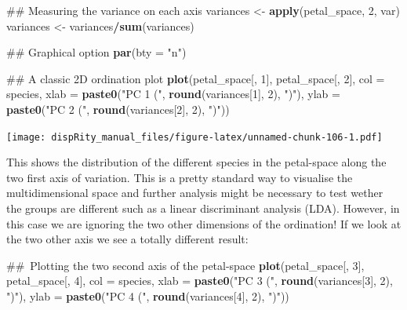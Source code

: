 \documentclass[]{book}
\newenvironment{Shaded}{\begin{snugshade}}{\end{snugshade}}
\newcommand{\KeywordTok}[1]{\textcolor[rgb]{0.13,0.29,0.53}{\textbf{#1}}}
\newcommand{\DataTypeTok}[1]{\textcolor[rgb]{0.13,0.29,0.53}{#1}}
\newcommand{\DecValTok}[1]{\textcolor[rgb]{0.00,0.00,0.81}{#1}}
\newcommand{\StringTok}[1]{\textcolor[rgb]{0.31,0.60,0.02}{#1}}
\newcommand{\OperatorTok}[1]{\textcolor[rgb]{0.81,0.36,0.00}{\textbf{#1}}}
\newcommand{\NormalTok}[1]{#1}
\theoremstyle{definition}
\theoremstyle{definition}
\theoremstyle{remark}
\begin{document}
\begin{Shaded}
\begin{Highlighting}[]
\NormalTok{## Measuring the variance on each axis}
\NormalTok{variances <-}\StringTok{ }\KeywordTok{apply}\NormalTok{(petal_space, }\DecValTok{2}\NormalTok{, var)}
\NormalTok{variances <-}\StringTok{ }\NormalTok{variances}\OperatorTok{/}\KeywordTok{sum}\NormalTok{(variances)}

\NormalTok{## Graphical option}
\KeywordTok{par}\NormalTok{(}\DataTypeTok{bty =} \StringTok{"n"}\NormalTok{)}

\NormalTok{## A classic 2D ordination plot}
\KeywordTok{plot}\NormalTok{(petal_space[, }\DecValTok{1}\NormalTok{], petal_space[, }\DecValTok{2}\NormalTok{], }\DataTypeTok{col =}\NormalTok{ species,}
    \DataTypeTok{xlab =} \KeywordTok{paste0}\NormalTok{(}\StringTok{"PC 1 ("}\NormalTok{, }\KeywordTok{round}\NormalTok{(variances[}\DecValTok{1}\NormalTok{], }\DecValTok{2}\NormalTok{), }\StringTok{")"}\NormalTok{),}
    \DataTypeTok{ylab =} \KeywordTok{paste0}\NormalTok{(}\StringTok{"PC 2 ("}\NormalTok{, }\KeywordTok{round}\NormalTok{(variances[}\DecValTok{2}\NormalTok{], }\DecValTok{2}\NormalTok{), }\StringTok{")"}\NormalTok{))}
\end{Highlighting}
\end{Shaded}

\texttt{[image: dispRity\_manual\_files/figure-latex/unnamed-chunk-106-1.pdf]}

This shows the distribution of the different species in the petal-space
along the two first axis of variation. This is a pretty standard way to
visualise the multidimensional space and further analysis might be
necessary to test wether the groups are different such as a linear
discriminant analysis (LDA). However, in this case we are ignoring the
two other dimensions of the ordination! If we look at the two other axis
we see a totally different result:

\begin{Shaded}
\begin{Highlighting}[]
\NormalTok{## Plotting the two second axis of the petal-space}
\KeywordTok{plot}\NormalTok{(petal_space[, }\DecValTok{3}\NormalTok{], petal_space[, }\DecValTok{4}\NormalTok{], }\DataTypeTok{col =}\NormalTok{ species,}
    \DataTypeTok{xlab =} \KeywordTok{paste0}\NormalTok{(}\StringTok{"PC 3 ("}\NormalTok{, }\KeywordTok{round}\NormalTok{(variances[}\DecValTok{3}\NormalTok{], }\DecValTok{2}\NormalTok{), }\StringTok{")"}\NormalTok{),}
    \DataTypeTok{ylab =} \KeywordTok{paste0}\NormalTok{(}\StringTok{"PC 4 ("}\NormalTok{, }\KeywordTok{round}\NormalTok{(variances[}\DecValTok{4}\NormalTok{], }\DecValTok{2}\NormalTok{), }\StringTok{")"}\NormalTok{))}
\end{Highlighting}
\end{Shaded}
\end{document}
